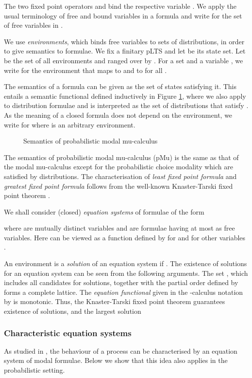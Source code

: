 \documentclass{article}
\begin{document}
The two fixed point operators  and  bind the
respective variable . We apply the usual terminology of free and
bound variables in a formula and write  for the set of
free variables in .

We use {\em environments}, which binds free variables to sets of
distributions, in order to give semantics to formulae. We fix a
finitary pLTS and let  be its state set. Let
 be the set of
all environments and ranged over by . For a set 
and a variable , we write  for the
environment that maps  to  and  to  for all
.

The semantics of a formula  can be given as the set of states
satisfying it. This entails a semantic functional  defined inductively in Figure
\ref{f:semantics}, where we also apply  to distribution
formulae and  is interpreted as the set of distributions
that satisfy . As the meaning of a closed formula  does
not depend on the environment, we write  for
 where  is an arbitrary environment.

\begin{figure}

\caption{Semantics of probabilistic modal
mu-calculus}\label{f:semantics}
\end{figure}

The semantics of probabilistic modal mu-calculus (pMu) is the same
as that of the modal mu-calculus \cite{Koz83} except for the
probabilistic choice modality which are satisfied by distributions.
The characterisation of {\em least fixed point
  formula}  and {\em greatest fixed point formula}  follows from the well-known Knaster-Tarski fixed point
theorem \cite{Tar55}.

We shall consider (closed) {\em equation systems} of formulae of the
form

where  are mutually distinct variables and
 are formulae having at most  as
free variables. Here  can be viewed as a function
 defined by  for
 and  for other variables .

An environment  is a {\em solution} of an equation system 
if . The existence of
solutions for an equation system can be seen from the following
arguments. The set , which includes all candidates for
solutions, together with the partial order  defined by
 forms a complete lattice. The
{\em equation functional}  given in the
-calculus notation by  is monotonic. Thus, the Knaster-Tarski fixed
point theorem guarantees existence of solutions, and the largest
solution



\subsubsection{Characteristic equation systems}\label{s:ces} As
studied in \cite{SI94}, the behaviour of a process can be
characterised by an equation system of modal formulae. Below we show
that this idea also applies in the probabilistic setting.
\end{document}
